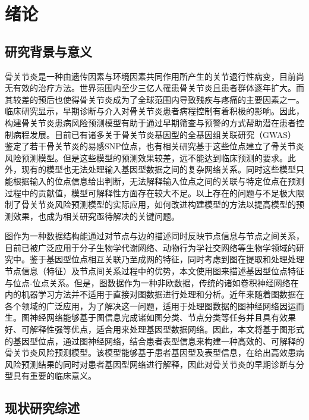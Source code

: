 \chapter{绪论}
\section{研究背景与意义}
骨关节炎是一种由遗传因素与环境因素共同作用所产生的关节退行性病变，目前尚无有效的治疗方法。世界范围内至少三亿人罹患骨关节炎且患者群体逐年扩大。而其较差的预后也使得骨关节炎成为了全球范围内导致残疾与疼痛的主要因素之一。临床研究显示，早期诊断与介入对骨关节炎患者病程控制有着积极的影响。因此，构建骨关节炎患病风险预测模型有助于通过早期筛查与预警的方式帮助潜在患者控制病程发展。目前已有诸多关于骨关节炎基因型的全基因组关联研究（GWAS）鉴定了若干骨关节炎的易感SNP位点，也有相关研究基于这些位点建立了骨关节炎风险预测模型。但是这些模型的预测效果较差，远不能达到临床预测的要求。此外，现有的模型也无法处理输入基因型数据之间的复杂网络关系。同时这些模型只能根据输入的位点信息给出判断，无法解释输入位点之间的关联与特定位点在预测过程中的贡献值，模型可解释性方面存在较大不足。以上存在的问题与不足极大限制了骨关节炎风险预测模型的实际应用，如何改进构建模型的方法以提高模型的预测效果，也成为相关研究亟待解决的关键问题。

图作为一种数据结构能通过对节点与边的描述同时反映节点信息与节点之间关系，目前已被广泛应用于分子生物学代谢网络、动物行为学社交网络等生物学领域的研究中。鉴于基因型位点相互关联乃至成网的特征，同时考虑到图在提取和处理处理节点信息（特征）及节点间关系过程中的优势，本文使用图来描述基因型位点特征与位点-位点关系。但是，图数据作为一种非欧数据，传统的诸如卷积神经网络在内的机器学习方法并不适用于直接对图数据进行处理和分析。近年来随着图数据在各个领域的广泛应用，为了解决这一问题，适用于处理图数据的图神经网络因运而生。图神经网络能够基于图信息完成诸如图分类、节点分类等任务并且具有效果好、可解释性强等优点，适合用来处理基因型数据网络。因此，本文将基于图形式的基因型位点，通过图神经网络，结合患者表型信息来构建一种高效的、可解释的骨关节炎风险预测模型。该模型能够基于患者基因型及表型信息，在给出高效患病风险预测结果的同时对患者基因型网络进行解释，因此对骨关节炎的早期诊断与分型具有重要的临床意义。
\section{现状研究综述}
